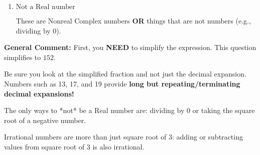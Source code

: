 \documentclass{extbook}[14pt]
\begin{document}
\begin{enumerate}
{\begin{enumerate}[label=\Alph*.]
These are numbers that can be written as fraction of Integers (e.g., -2/3)
\item \( \text{Not a Real number} \)

These are Nonreal Complex numbers \textbf{OR} things that are not numbers (e.g., dividing by 0).
\end{enumerate}

\textbf{General Comment:} First, you \textbf{NEED} to simplify the expression. This question simplifies to $152$. 
 
 Be sure you look at the simplified fraction and not just the decimal expansion. Numbers such as 13, 17, and 19 provide \textbf{long but repeating/terminating decimal expansions!} 
 
 The only ways to *not* be a Real number are: dividing by 0 or taking the square root of a negative number. 
 
 Irrational numbers are more than just square root of 3: adding or subtracting values from square root of 3 is also irrational.
}
\end{enumerate}
\end{document}
